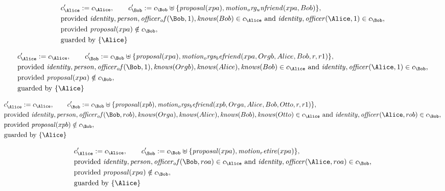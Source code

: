 \begin{align*}
&
c'_
{
\Alice
}
 := 
c_
{
\Alice
}
, \qquad 
c'_
{
\Bob
}
 := 
c_
{
\Bob
}
 \uplus 
\{
\mathit{
proposal
}
(
xpa
)
,
\mathit{
motion_org_unfriend
}
(
xpa
,
Bob
)
\}
,\\
&
\text{provided } 
\mathit{
identity
}
,
\mathit{
person
}
,
\mathit{
officer_of
}
(
\Bob
,
1
)
,
\mathit{
knows
}
(
Bob
)
 \in c_
{
\Alice
}
 \text{ and } 
\mathit{
identity
}
,
\mathit{
officer
}
(
\Alice
,
1
)
 \in c_
{
\Bob
}
,\\
&
\text{provided } 
\mathit{
proposal
}
(
xpa
)
 \notin c_
{
\Bob
}
,\\
&
\text{guarded by } \{
\Alice
\}
\end{align*}

\begin{align*}
&
c'_
{
\Alice
}
 := 
c_
{
\Alice
}
, \qquad 
c'_
{
\Bob
}
 := 
c_
{
\Bob
}
 \uplus 
\{
\mathit{
proposal
}
(
xpa
)
,
\mathit{
motion_orgs_befriend
}
(
xpa
,
Orgb
,
Alice
,
Bob
,
r
,
r1
)
\}
,\\
&
\text{provided } 
\mathit{
identity
}
,
\mathit{
person
}
,
\mathit{
officer_of
}
(
\Bob
,
1
)
,
\mathit{
knows
}
(
Orgb
)
,
\mathit{
knows
}
(
Alice
)
,
\mathit{
knows
}
(
Bob
)
 \in c_
{
\Alice
}
 \text{ and } 
\mathit{
identity
}
,
\mathit{
officer
}
(
\Alice
,
1
)
 \in c_
{
\Bob
}
,\\
&
\text{provided } 
\mathit{
proposal
}
(
xpa
)
 \notin c_
{
\Bob
}
,\\
&
\text{guarded by } \{
\Alice
\}
\end{align*}

\begin{align*}
&
c'_
{
\Alice
}
 := 
c_
{
\Alice
}
, \qquad 
c'_
{
\Bob
}
 := 
c_
{
\Bob
}
 \uplus 
\{
\mathit{
proposal
}
(
xpb
)
,
\mathit{
motion_orgs_befriend
}
(
xpb
,
Orga
,
Alice
,
Bob
,
Otto
,
r
,
r1
)
\}
,\\
&
\text{provided } 
\mathit{
identity
}
,
\mathit{
person
}
,
\mathit{
officer_of
}
(
\Bob
,
rob
)
,
\mathit{
knows
}
(
Orga
)
,
\mathit{
knows
}
(
Alice
)
,
\mathit{
knows
}
(
Bob
)
,
\mathit{
knows
}
(
Otto
)
 \in c_
{
\Alice
}
 \text{ and } 
\mathit{
identity
}
,
\mathit{
officer
}
(
\Alice
,
rob
)
 \in c_
{
\Bob
}
,\\
&
\text{provided } 
\mathit{
proposal
}
(
xpb
)
 \notin c_
{
\Bob
}
,\\
&
\text{guarded by } \{
\Alice
\}
\end{align*}

\begin{align*}
&
c'_
{
\Alice
}
 := 
c_
{
\Alice
}
, \qquad 
c'_
{
\Bob
}
 := 
c_
{
\Bob
}
 \uplus 
\{
\mathit{
proposal
}
(
xpa
)
,
\mathit{
motion_retire
}
(
xpa
)
\}
,\\
&
\text{provided } 
\mathit{
identity
}
,
\mathit{
person
}
,
\mathit{
officer_of
}
(
\Bob
,
roa
)
 \in c_
{
\Alice
}
 \text{ and } 
\mathit{
identity
}
,
\mathit{
officer
}
(
\Alice
,
roa
)
 \in c_
{
\Bob
}
,\\
&
\text{provided } 
\mathit{
proposal
}
(
xpa
)
 \notin c_
{
\Bob
}
,\\
&
\text{guarded by } \{
\Alice
\}
\end{align*}

